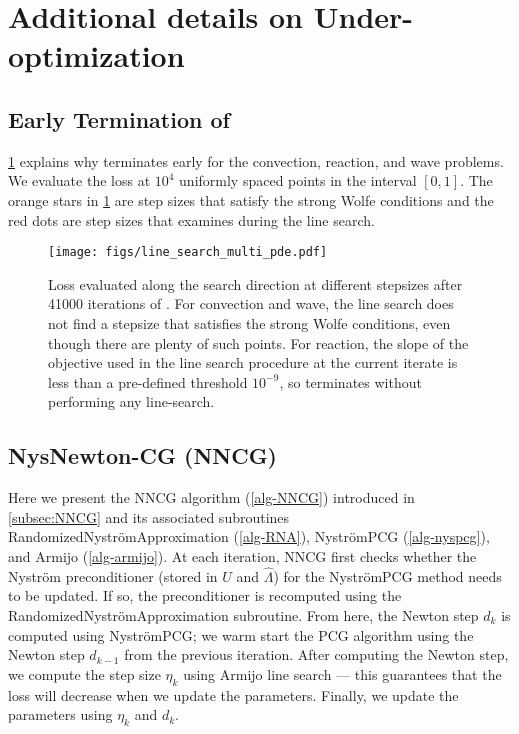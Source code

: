 \section{Additional details on Under-optimization}
\label{sec:under_optimization_additional}

\subsection{Early Termination of \lbfgs{}}
\cref{fig:line_search_multi_pde} explains why \lbfgs{} terminates early for the convection, reaction, and wave problems.
We evaluate the loss at $10^{4}$ uniformly spaced points in the interval $[0, 1]$.
The orange stars in \cref{fig:line_search_multi_pde} are step sizes that satisfy the strong Wolfe conditions and the red dots are step sizes that \lbfgs{} examines during the line search.

\begin{figure}
    \centering
    \texttt{[image: figs/line\_search\_multi\_pde.pdf]}
    \caption{Loss evaluated along the \lbfgs{} search direction at different stepsizes after 41000 iterations of \al{}. For convection and wave, the line search does not find a stepsize that satisfies the strong Wolfe conditions, even though there are plenty of such points. For reaction, the slope of the objective used in the line search procedure at the current iterate is less than a pre-defined threshold $10^{-9}$, so \lbfgs{} terminates without performing any line-search.}
    \label{fig:line_search_multi_pde}
\end{figure}

\subsection{NysNewton-CG (NNCG)}
Here we present the NNCG algorithm (\cref{alg-NNCG}) introduced in \cref{subsec:NNCG} and its associated subroutines RandomizedNystr{\"o}mApproximation (\cref{alg-RNA}), Nystr\"{o}mPCG (\cref{alg-nyspcg}), and Armijo (\cref{alg-armijo}).
At each iteration, NNCG first checks whether the Nystr\"{o}m preconditioner (stored in $U$ and  $\hat{\Lambda}$) for the Nystr\"{o}mPCG method needs to be updated.
If so, the preconditioner is recomputed using the RandomizedNystr{\"o}mApproximation subroutine.
From here, the Newton step $d_k$ is computed using Nystr\"{o}mPCG; we warm start the PCG algorithm using the Newton step $d_{k - 1}$ from the previous iteration.
After computing the Newton step, we compute the step size $\eta_k$ using Armijo line search --- this guarantees that the loss will decrease when we update the parameters.
Finally, we update the parameters using $\eta_k$ and $d_k$.

